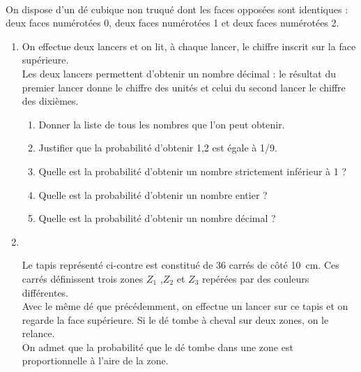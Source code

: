 \activites

\begin{activite}
   \ \\ [-16mm]
   \begin{QCM}
      On dispose d’un dé cubique non truqué dont les faces opposées sont identiques : \\
      deux faces numérotées 0, deux faces numérotées 1 et deux faces numérotées 2.
      \begin{enumerate}
         \item On effectue deux lancers et on lit, à chaque lancer, le chiffre inscrit sur la face supérieure. \\
             Les deux lancers permettent d’obtenir un nombre décimal : le résultat du premier lancer donne le chiffre des unités et celui du second lancer le chiffre des dixièmes.
            \begin{enumerate}
               \item Donner la liste de tous les nombres que l’on peut obtenir.       
               \item Justifier que la probabilité d’obtenir 1,2 est égale à 1/9. 
               \item Quelle est la probabilité d’obtenir un nombre strictement inférieur à 1 ?
               \item Quelle est la probabilité d’obtenir un nombre entier ?
               \item Quelle est la probabilité d’obtenir un nombre décimal ?
            \end{enumerate}
         \item \ \\ [-4.5mm]
            \begin{minipage}{11.5cm}
               Le tapis représenté ci-contre est constitué de 36 carrés de côté 10~cm. Ces carrés définissent trois zones $Z_1$ ,$Z_2$ et $Z_ 3$ repérées par des couleurs différentes. \\
               Avec le même dé que précédemment, on effectue un lancer sur ce tapis et on regarde la face supérieure. Si le dé tombe à cheval sur deux zones, on le relance. \\
               On admet que la probabilité que le dé tombe dans une zone est proportionnelle à l’aire de la zone.
            \end{minipage}
            \begin{minipage}{3.75cm}

\end{minipage}
\end{enumerate}
\end{QCM}
\end{activite}
